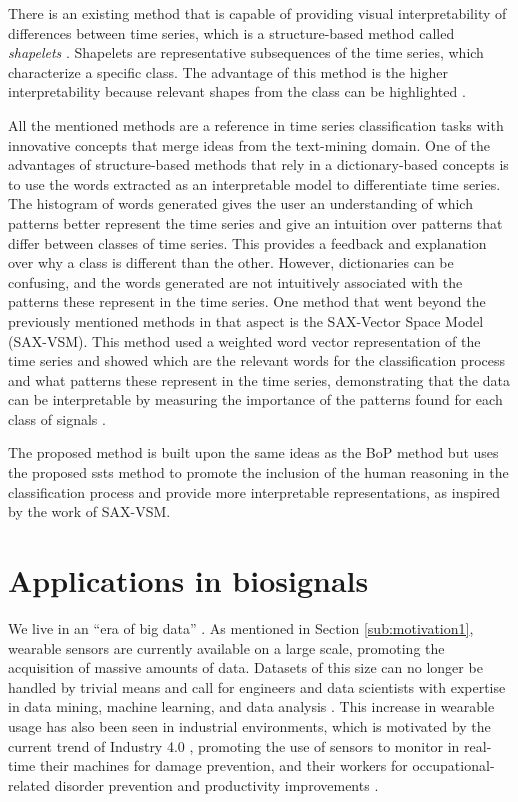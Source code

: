 \par
There is an existing method that is capable of providing visual interpretability of differences between time series, which is a structure-based method called \textit{shapelets} \cite{shapelets}. Shapelets are representative subsequences of the time series, which characterize a specific class. The advantage of this method is the higher interpretability because relevant shapes from the class can be highlighted \cite{shapelets}. 
\par
All the mentioned methods are a reference in time series classification tasks with innovative concepts that merge ideas from the text-mining domain. One of the advantages of structure-based methods that rely in a dictionary-based concepts is to use the words extracted as an interpretable model to differentiate time series. The histogram of words generated gives the user an understanding of which patterns better represent the time series and give an intuition over patterns that differ between classes of time series. This provides a feedback and explanation over why a class is different than the other. However, dictionaries can be confusing, and the words generated are not intuitively associated with the patterns these represent in the time series. One method that went beyond the previously mentioned methods in that aspect is the SAX-Vector Space Model (SAX-VSM)\cite{sax_vsm}. This method used a weighted word vector representation of the time series and showed which are the relevant words for the classification process and what patterns these represent in the time series, demonstrating that the data can be interpretable by measuring the importance of the patterns found for each class of signals \cite{sax_vsm}. 
\par
The proposed method is built upon the same ideas as the BoP method but uses the proposed \gls{ssts} method to promote the inclusion of the human reasoning in the classification process and provide more interpretable representations, as inspired by the work of SAX-VSM.

\section{Applications in biosignals}

We live in an ``era of big data'' \cite{chen2014big}. As mentioned in Section \ref{sub:motivation1}, wearable sensors are currently available on a large scale, promoting the acquisition of massive amounts of data.
Datasets of this size can no longer be handled by trivial means and call for engineers and data scientists with expertise in data mining, machine learning, and data analysis \cite{weiner2017bremen}.
This increase in wearable usage has also been seen in industrial environments, which is motivated by the current trend of Industry 4.0 \cite{xu2018industry}, promoting the use of sensors to monitor in real-time their machines for damage prevention, and their workers for occupational-related disorder prevention and productivity improvements \cite{Varandas19, santos2019}.

